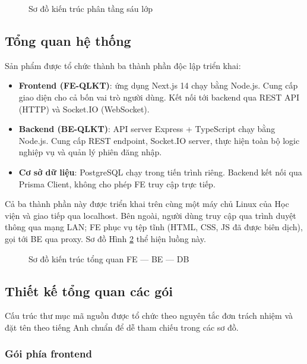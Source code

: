 \documentclass[../DoAn.tex]{subfiles}
\begin{document}
\begin{figure}[H]
    \centering
    \caption{Sơ đồ kiến trúc phân tầng sáu lớp}
    \label{fig:kientruc-phantang}
\end{figure}

\subsection{Tổng quan hệ thống}
\label{subsection:4.1.2}

Sản phẩm được tổ chức thành ba thành phần độc lập triển khai:

\begin{itemize}
    \item \textbf{Frontend (FE-QLKT)}: ứng dụng Next.js 14 chạy bằng Node.js. Cung cấp giao diện cho cả bốn vai trò người dùng. Kết nối tới backend qua REST API (HTTP) và Socket.IO (WebSocket).
    \item \textbf{Backend (BE-QLKT)}: API server Express + TypeScript chạy bằng Node.js. Cung cấp REST endpoint, Socket.IO server, thực hiện toàn bộ logic nghiệp vụ và quản lý phiên đăng nhập.
    \item \textbf{Cơ sở dữ liệu}: PostgreSQL chạy trong tiến trình riêng. Backend kết nối qua Prisma Client, không cho phép FE truy cập trực tiếp.
\end{itemize}

Cả ba thành phần này được triển khai trên cùng một máy chủ Linux của Học viện và giao tiếp qua localhost. Bên ngoài, người dùng truy cập qua trình duyệt thông qua mạng LAN; FE phục vụ tệp tĩnh (HTML, CSS, JS đã được biên dịch), gọi tới BE qua proxy. Sơ đồ Hình \ref{fig:kientruc-tongquan} thể hiện luồng này.

\begin{figure}[H]
    \centering
    \caption{Sơ đồ kiến trúc tổng quan FE --- BE --- DB}
    \label{fig:kientruc-tongquan}
\end{figure}

\subsection{Thiết kế tổng quan các gói}
\label{subsection:4.1.3}

Cấu trúc thư mục mã nguồn được tổ chức theo nguyên tắc đơn trách nhiệm và đặt tên theo tiếng Anh chuẩn để dễ tham chiếu trong các sơ đồ.

\subsubsection{Gói phía frontend}
\end{document}
